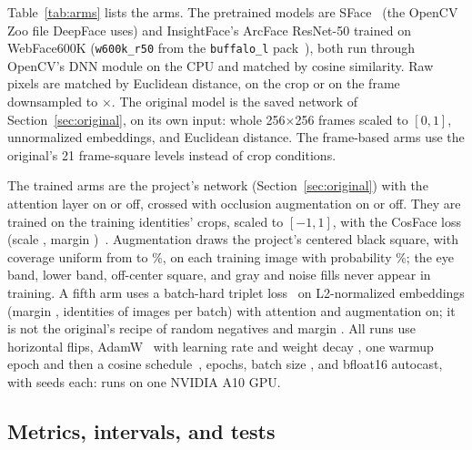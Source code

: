 Table~\ref{tab:arms} lists the arms. The pretrained models are SFace~\cite{zhong2021sface} (the OpenCV Zoo file DeepFace uses) and InsightFace's ArcFace ResNet-50 trained on WebFace600K (\texttt{w600k\_r50} from the \texttt{buffalo\_l} pack~\cite{insightface}), both run through OpenCV's DNN module on the CPU and matched by cosine similarity. Raw pixels are matched by Euclidean distance, on the crop or on the frame downsampled to $\times$. The original model is the saved network of Section~\ref{sec:original}, on its own input: whole 256$\times$256 frames scaled to $[0,1]$, unnormalized embeddings, and Euclidean distance. The frame-based arms use the original's 21 frame-square levels instead of crop conditions.

The trained arms are the project's network (Section~\ref{sec:original}) with the attention layer on or off, crossed with occlusion augmentation on or off. They are trained on the training identities' crops, scaled to $[-1,1]$, with the CosFace loss (scale , margin )~\cite{wang2018cosface}. Augmentation draws the project's centered black square, with coverage uniform from  to \%, on each training image with probability \%; the eye band, lower band, off-center square, and gray and noise fills never appear in training. A fifth arm uses a batch-hard triplet loss~\cite{hermans2017defense} on L2-normalized embeddings (margin ,  identities of  images per batch) with attention and augmentation on; it is not the original's recipe of random negatives and margin . All runs use horizontal flips, AdamW~\cite{loshchilov2019decoupled} with learning rate  and weight decay , one warmup epoch and then a cosine schedule~\cite{loshchilov2017sgdr},  epochs, batch size , and bfloat16 autocast, with  seeds each:  runs on one NVIDIA A10 GPU.

\begin{table}[t]
\caption{Arms of the study. Crop = the $\times$ aligned crop; frame = the whole image. ``Both'' = attention and occlusion augmentation. Each trained CNN has  seeds.}
\label{tab:arms}
\centering\small
\setlength{\tabcolsep}{3pt}

\end{table}

\subsection{Metrics, intervals, and tests}\label{sec:metrics}

